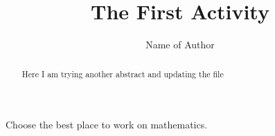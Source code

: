 \documentclass{ximera}
\title{The First Activity}
\author{Name of Author}
\begin{document}
\begin{abstract}
Here I am trying another abstract and updating the file
\end{abstract}
\maketitle
\begin{exercise}
  Choose the best place to work on mathematics.
  \begin{multipleChoice}
  \end{multipleChoice}
\end{exercise}
\end{document}
